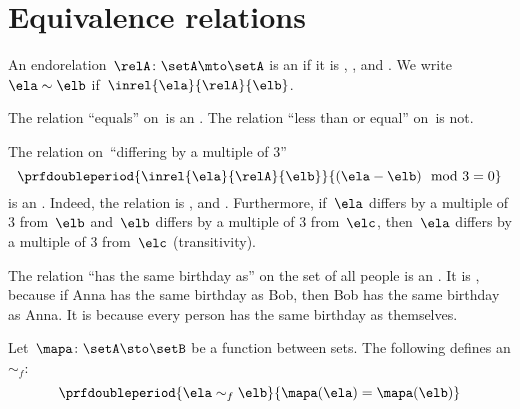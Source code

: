 
\section{Equivalence relations}

\begin{ctdefinition}
    \label{def:equivalence-relation}
    An endorelation~$\relA\colon \setA\mto \setA$ is an  if it is , , and .
    We write~$\ela\sim \elb$ if~$\inrel{\ela}{\relA}{\elb}$.
\end{ctdefinition}

\begin{example}
    The relation ``equals'' on~\natnumbers  is an .
    The relation ``less than or equal'' on~\natnumbers  is not.
\end{example}

\begin{example}
    The relation on~\natnumbers  ``differing by a multiple of 3''
    \begin{equation}
        \prfdoubleperiod{
            \inrel{\ela}{\relA}{\elb}
        }{
            (\ela-\elb) \mod 3 = 0
        }
    \end{equation}
    is an .
    Indeed, the relation is , and .
    Furthermore, if~$\ela$ differs by a multiple of 3 from~$\elb$ and~$\elb$ differs by a multiple of 3 from~$\elc$, then~$\ela$ differs by a multiple of 3 from~$\elc$ (transitivity).
\end{example}

\begin{example}
    The relation ``has the same birthday as'' on the set of all people is an .
    It is , because if Anna has the same birthday as Bob, then Bob has the same birthday as Anna.
    It is  because every person has the same birthday as themselves.
\end{example}

\begin{example}
    Let~$\mapa\colon \setA \sto \setB$ be a function between sets.
    The following defines an  $\sim_f$:
    \begin{equation}
        \prfdoubleperiod{
            \ela\sim_f \elb
        }{
            \mapa(\ela)=\mapa(\elb)
        }
    \end{equation}
\end{example}

